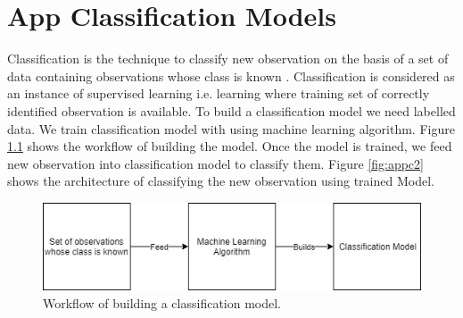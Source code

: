 \chapter{App Classification Models}
\label{ch:proposed}

\thispagestyle{empty}
Classification is the technique to classify new observation on the basis of a set of data containing observations whose class is known \cite{wiki:xxx}. Classification is considered as an instance of supervised learning i.e. learning where training set of correctly identified observation is available. To build a classification model we need labelled data. We train classification model with using machine learning algorithm. Figure \ref{fig:appc1} shows the workflow of building the model. Once the model is trained, we feed new observation into classification model to classify them. Figure \ref{fig:appc2} shows the architecture of classifying the new observation using trained Model.
\begin{figure}[!h]
  \centering
  \includegraphics [scale=0.8] {appc1.jpg}
  \caption{Workflow of building a classification model.}
  \label{fig:appc1}
\end{figure}

